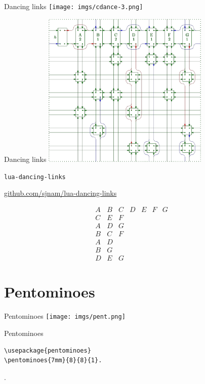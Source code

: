 \documentclass[xcolor=svgnames]{beamer}
\begin{document}
%
\begin{frame}{Dancing links}
  \centering\texttt{[image: imgs/cdance-3.png]}
\end{frame}

%
\begin{frame}{Dancing links}
  \centering\includegraphics[height=7.5cm]{imgs/cdance-4.png}
\end{frame}

%
\begin{frame}{\texttt{lua-dancing-links}}
\begin{center}
  \href{https://github.com/sjnam/lua-dancing-links}
       {github.com/sjnam/lua-dancing-links}
\end{center}
\boldmath
{
\large
$$
  \begin{array}{ccccccc}
    A & B & C & D & E & F & G\\
    C & E &F &&&&\\
    A & D & G &&&&\\
    B & C & F &&&&\\
    A & D &&&&&\\
    B & G &&&&&\\
    D & E & G &&&&
  \end{array}
$$
}
\end{frame}


\section{Pentominoes}

%
\begin{frame}[fragile]{Pentominoes}
  \centering\texttt{[image: imgs/pent.png]}
\end{frame}

%
\begin{frame}[fragile]{Pentominoes}
\begin{verbatim}
\usepackage{pentominoes}
\pentominoes{7mm}{8}{8}{1}.
\end{verbatim}
.
\end{frame}
\end{document}
